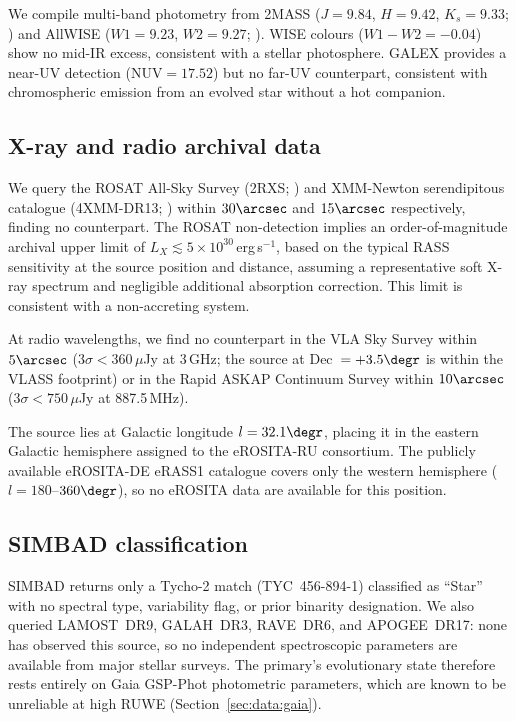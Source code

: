 \documentclass[usenatbib,fleqn]{mnras}
\begin{document}
We compile multi-band photometry from 2MASS
($J = 9.84$, $H = 9.42$, $K_s = 9.33$; \citealt{Cutri2003}) and
AllWISE ($W1 = 9.23$, $W2 = 9.27$; \citealt{Cutri2014}).
WISE colours ($W1 - W2 = -0.04$) show no mid-IR excess,
consistent with a stellar photosphere.
GALEX \citep{Bianchi2017} provides a near-UV detection
($\mathrm{NUV} = 17.52$) but no far-UV counterpart, consistent
with chromospheric emission from an evolved star without a hot
companion.

\subsection{X-ray and radio archival data}
\label{sec:data:xray}

We query the ROSAT All-Sky Survey (2RXS; \citealt{Boller2016}) and
XMM-Newton serendipitous catalogue (4XMM-DR13;
\citealt{Webb2020}) within $30\arcsec$ and $15\arcsec$
respectively, finding no counterpart.  The ROSAT non-detection
implies an order-of-magnitude archival upper limit of
$L_X \lesssim 5 \times 10^{30}$\,erg\,s$^{-1}$,
based on the typical RASS sensitivity at the source position and
distance, assuming a representative soft X-ray spectrum and
negligible additional absorption correction.  This limit is
consistent with a non-accreting system.

At radio wavelengths, we find no counterpart in the VLA Sky Survey
\citep[VLASS;][]{Lacy2020} within $5\arcsec$ ($3\sigma <
360\,\mu$Jy at 3\,GHz; the source at Dec~$= +3.5\degr$ is within
the VLASS footprint) or in the Rapid ASKAP Continuum Survey
\citep[RACS;][]{McConnell2020} within $10\arcsec$ ($3\sigma <
750\,\mu$Jy at 887.5\,MHz).

The source lies at Galactic longitude $l = 32.1\degr$, placing it
in the eastern Galactic hemisphere assigned to the eROSITA-RU
consortium.  The publicly available eROSITA-DE eRASS1 catalogue
\citep{Merloni2024} covers only the western hemisphere
($l = 180$--$360\degr$), so no eROSITA data are available for
this position.

\subsection{SIMBAD classification}
\label{sec:data:simbad}

SIMBAD \citep{Wenger2000} returns only a Tycho-2 match
(TYC~456-894-1) classified as ``Star'' with no spectral type,
variability flag, or prior binarity designation.  We also queried
LAMOST~DR9, GALAH~DR3, RAVE~DR6, and APOGEE~DR17: none has
observed this source, so no independent spectroscopic parameters
are available from major stellar surveys.  The primary's
evolutionary state therefore rests entirely on Gaia GSP-Phot
photometric parameters, which are known to be unreliable at
high RUWE (Section~\ref{sec:data:gaia}).
\end{document}
